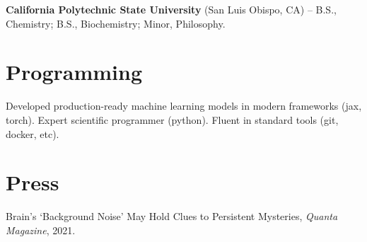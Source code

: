 \documentclass[margin,line]{res}
\begin{document}
\begin{resume}
\vspace*{-.15in}
{\bf California Polytechnic State University} (San Luis Obispo, CA) -- B.S., Chemistry; B.S., Biochemistry; Minor, Philosophy.\\

\vspace{-.6cm}
\section{\sc Programming} Developed production-ready machine learning models in modern frameworks (jax, torch). Expert scientific programmer (python). Fluent in standard tools (git, docker, etc).

\vspace{-.3cm}
\section{\sc Press}
Brain's `Background Noise' May Hold Clues to Persistent Mysteries, \emph{Quanta Magazine}, 2021. \\
    
\vspace{-.6cm} 

\end{resume}
\end{document}
